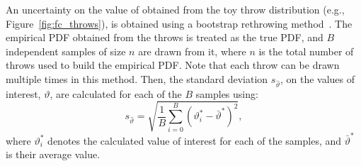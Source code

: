 An uncertainty on the value of \dchisqcrit obtained from the toy throw distribution (e.g., Figure~\ref{fig:fc_throws}), is obtained using a bootstrap rethrowing method~\cite{rice2006mathematical}. The empirical PDF obtained from the throws is treated as the true PDF, and $B$ independent samples of size $n$ are drawn from it, where $n$ is the total number of throws used to build the empirical PDF. Note that each throw can be drawn multiple times in this method. Then, the standard deviation $s_{\hat{\vartheta}}$, on the \dchisqcrit values of interest, $\vartheta$, are calculated for each of the $B$ samples using:
\begin{equation}
  s_{\hat{\vartheta}} = \sqrt{\frac{1}{B} \sum^{B}_{i=0} (\vartheta_{i}^{*} - \bar{\vartheta}^{*})^{2}},
  \label{eq:fc_uncertainty}
\end{equation}
where $\vartheta_{i}^{*}$ denotes the calculated \dchisqcrit value of interest for each of the samples, and $\bar{\vartheta}^{*}$ is their average value.

